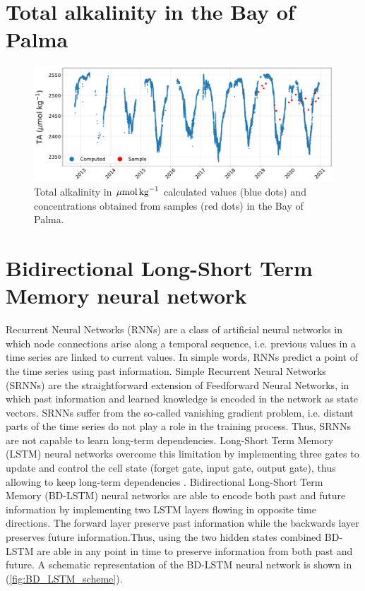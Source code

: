 \section{Total alkalinity in the Bay of Palma}

\begin{figure}[H]
    \centering
    \includegraphics[width=\textwidth]{Figures/S1.pdf}
    \caption{Total alkalinity in ${\mu \textrm{mol\,kg}^{-1}}$ calculated
        values (blue dots) and concentrations obtained from samples (red dots)
        in the
        Bay of Palma.}
    \label{fig:S1}
\end{figure}

\section{Bidirectional Long-Short Term Memory neural network}

Recurrent Neural Networks (RNNs) are a class of artificial neural networks
in which node connections arise along a temporal sequence, i.e. previous values
in a time series are linked to current values. In simple words, RNNs predict a
point of the time series using past information. Simple Recurrent Neural
Networks (SRNNs) are the straightforward extension of Feedforward Neural
Networks, in which past information and learned knowledge is encoded in the
network as state vectors. SRNNs suffer from the so-called vanishing gradient
problem, i.e. distant parts of the time series do not play a role in the
training process. Thus, SRNNs are not capable to learn long-term dependencies.
Long-Short Term Memory (LSTM) neural networks overcome this limitation by
implementing three gates to update and control the cell state (forget gate,
input gate, output gate), thus allowing to keep long-term dependencies
\cite{LSTM_NN}. Bidirectional Long-Short Term Memory (BD-LSTM) neural networks
are able to encode both past and future information by implementing two LSTM
layers flowing in opposite time directions. The forward layer preserve past
information while the backwards layer preserves future information.Thus, using
the two hidden states combined BD-LSTM are able in any point in time to
preserve information from both past and future. A schematic representation of
the BD-LSTM neural network is shown in (\cref{fig:BD_LSTM_scheme}).

